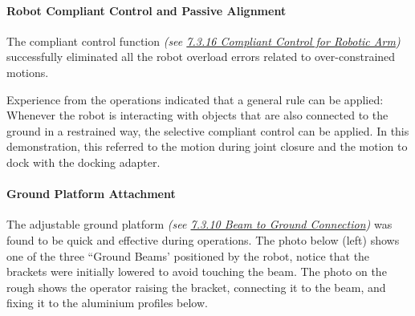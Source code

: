 \documentclass[11pt]{book}
\begin{document}
\paragraph{Robot Compliant Control and Passive Alignment}

The compliant control function \textit{(see \uline{7.3.16 Compliant Control for Robotic Arm})} successfully eliminated all the robot overload errors related to over-constrained motions. 

Experience from the operations indicated that a general rule can be applied: Whenever the robot is interacting with objects that are also connected to the ground in a restrained way, the selective compliant control can be applied. In this demonstration, this referred to the motion during joint closure and the motion to dock with the docking adapter.

\paragraph{Ground Platform Attachment}

The adjustable ground platform \textit{(see \uline{7.3.10 Beam to Ground Connection})} was found to be quick and effective during operations. The photo below (left) shows one of the three ``Ground Beams' positioned by the robot, notice that the brackets were initially lowered to avoid touching the beam. The photo on the rough shows the operator raising the bracket, connecting it to the beam, and fixing it to the aluminium profiles below.
\end{document}
